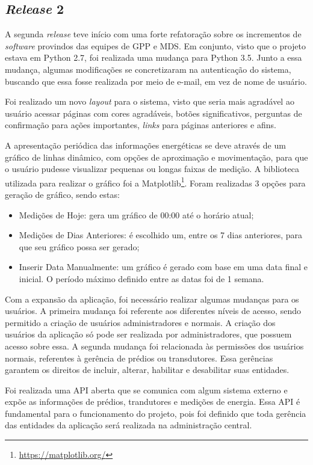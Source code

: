 \subsection{\textit{Release} 2}
A segunda \textit{release} teve início com uma forte refatoração sobre os incrementos de \textit{software} provindos das equipes de GPP e MDS. Em conjunto, visto que o projeto estava em Python 2.7, foi realizada uma mudança para Python 3.5. Junto a essa mudança, algumas modificações se concretizaram na autenticação do sistema, buscando que essa fosse realizada por meio de e-mail, em vez de nome de usuário.

Foi realizado um novo \textit{layout} para o sistema, visto que seria mais agradável ao usuário acessar páginas com cores agradáveis, botões significativos, perguntas de confirmação para ações importantes, \textit{links} para páginas anteriores e afins.

A apresentação periódica das informações energéticas se deve através de um gráfico de linhas dinâmico, com opções de aproximação e movimentação, para que o usuário pudesse visualizar pequenas ou longas faixas de medição. A biblioteca utilizada para realizar o gráfico foi a Matplotlib\footnote{\url{https://matplotlib.org/}}. Foram realizadas 3 opções para geração de gráfico, sendo estas:

\begin{itemize}
    \item Medições de Hoje: gera um gráfico de 00:00 até o horário atual;
    \item Medições de Dias Anteriores: é escolhido um, entre os 7 dias anteriores, para que seu gráfico possa ser gerado;
    \item Inserir Data Manualmente: um gráfico é gerado com base em uma data final e inicial. O período máximo definido entre as datas foi de 1 semana.
\end{itemize}

Com a expansão da aplicação, foi necessário realizar algumas mudanças para os usuários. A primeira mudança foi referente aos diferentes níveis de acesso, sendo permitido a criação de usuários administradores e normais. A criação dos usuários da aplicação só pode ser realizada por administradores, que possuem acesso sobre essa. A segunda mudança foi relacionada às permissões dos usuários normais, referentes à gerência de prédios ou transdutores. Essa gerências garantem os direitos de incluir, alterar, habilitar e desabilitar suas entidades.

Foi realizada uma API aberta que se comunica com algum sistema externo e expõe as informações de prédios, trandutores e medições de energia. Essa API é fundamental para o funcionamento do projeto, pois foi definido que toda gerência das entidades da aplicação será realizada na administração central.

